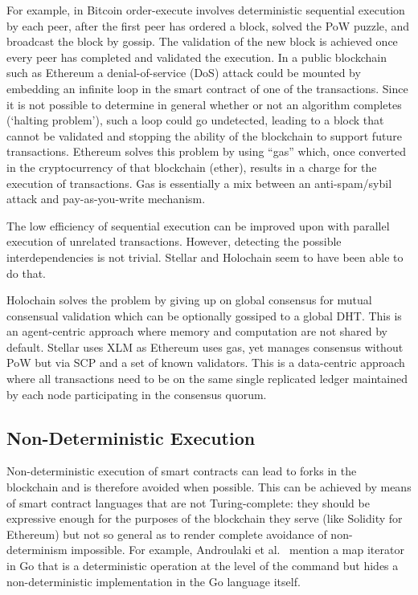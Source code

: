 For example, in Bitcoin order-execute involves deterministic sequential execution by each peer, after the first peer has ordered a block, solved the PoW puzzle, and broadcast the block by gossip. The validation of the new block is achieved once every peer has completed and validated the execution. In a public blockchain such as Ethereum a denial-of-service (DoS) attack could be mounted by embedding an infinite loop in the smart contract of one of the transactions. Since it is not possible to determine in general whether or not an algorithm completes (`halting problem'), such a loop could go undetected, leading to a block that cannot be validated and stopping the ability of the blockchain to support future transactions. Ethereum solves this problem by using ``gas'' which, once converted in the cryptocurrency of that blockchain (ether), results in a charge for the execution of transactions. Gas is essentially a mix between an anti-spam/sybil attack and pay-as-you-write mechanism.

The low efficiency of sequential execution can be improved upon with parallel execution of unrelated transactions. However, detecting the possible interdependencies is not trivial. Stellar and Holochain seem to have been able to do that.

Holochain solves the problem by giving up on global consensus for mutual consensual validation which can be optionally gossiped to a global DHT. This is an agent-centric approach where memory and computation are not shared by default. Stellar uses XLM as Ethereum uses gas, yet manages consensus without PoW but via SCP and a set of known validators. This is a data-centric approach where all transactions need to be on the same single replicated ledger maintained by each node participating in the consensus quorum.


\subsection{Non-Deterministic Execution}
Non-deterministic execution of smart contracts can lead to forks in the blockchain and is therefore avoided when possible. This can be achieved by means of smart contract languages that are not Turing-complete: they should be expressive enough for the purposes of the blockchain they serve (like Solidity for Ethereum) but not so general as to render complete avoidance of non-determinism impossible. For example, Androulaki et al.\ \cite{AndroulakiEtAl2018} mention a map iterator in Go that is a deterministic operation at the level of the command but hides a non-deterministic implementation in the Go language itself.

